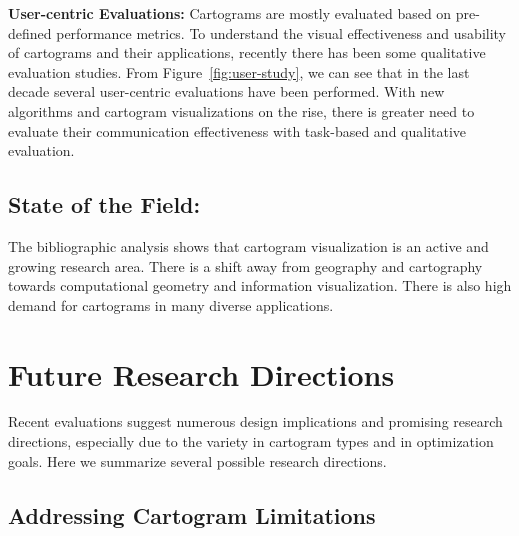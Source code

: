 \documentclass{egpubl}
\begin{document}
\textbf{User-centric Evaluations:}
Cartograms are mostly evaluated based on pre-defined performance metrics. To understand the visual effectiveness and usability of cartograms and their applications, recently there has been some qualitative evaluation studies. From Figure~\ref{fig:user-study}, we can see that in the last decade several user-centric evaluations have been performed.  With new algorithms and cartogram visualizations on the rise, there is greater need to evaluate their communication effectiveness with task-based and qualitative evaluation. 


\subsection{State of the Field:}
The bibliographic analysis shows that cartogram visualization is an active and growing research area. There is a shift away from geography and cartography towards computational geometry and information visualization. There is also high demand for cartograms in many diverse applications. 



\section{Future Research Directions}

Recent evaluations suggest numerous design implications and promising research directions, especially due to the variety in cartogram types and in optimization goals. Here we summarize several possible research directions.




\subsection{Addressing Cartogram Limitations}
\end{document}
